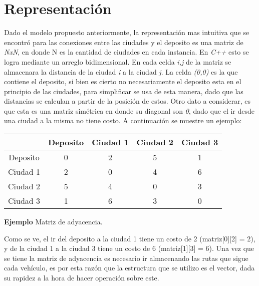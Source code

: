 \documentclass[letter, 10pt]{article}
\begin{document}
\newpage
\section{Representaci\'on}
Dado el modelo propuesto anteriormente, la representaci\'on mas intuitiva que se encontr\'o para las conexiones entre las ciudades y el deposito es una matriz de \emph{NxN}, 
en donde N es la cantidad de ciudades en cada instancia. En \emph{C++} esto se logra mediante un arreglo bidimensional. En cada celda \emph{i,j} de la matriz se almacenara la distancia de la
ciudad \emph{i} a la ciudad \emph{j}. La celda \emph{(0,0)} es la que contiene el deposito, si bien es cierto no necesariamente el deposito esta en el principio de las ciudades, para simplificar 
se usa de esta manera, dado que las distancias se calculan a partir de la posici\'on de estos. Otro dato a considerar, es que esta es una matriz sim\'etrica en donde su diagonal son \emph{0}, dado 
que el ir desde una ciudad a la misma no tiene costo. A continuaci\'on se muestre un ejemplo:

\begin{center}
 \begin{tabular}[t]{|c|c|c|c|c|}
\hline
           & Deposito & Ciudad 1 & Ciudad 2 & Ciudad 3 \\
\hline
Deposito   & 0        & 2        & 5        & 1\\
\hline
Ciudad 1   & 2        & 0        & 4        & 6\\
\hline
Ciudad 2   & 5        & 4        & 0        & 3\\
\hline
Ciudad 3   & 1        & 6        & 3        & 0\\
\hline
\end{tabular}

\end{center}
\begin{center}
\textbf{Ejemplo} Matriz de adyacencia. 
\end{center}
Como se ve, el ir del deposito a la ciudad 1 tiene un costo de 2 (matriz[0][2] = 2), y de la ciudad 1 a la ciudad 3 tiene un costo de 6 (matriz[1][3] = 6).
\newline
Una vez que se tiene la matriz de adyacencia es necesario ir almacenando las rutas que sigue cada veh\'iculo, es por esta raz\'on que la estructura que se utilizo es el vector, dada su rapidez 
a la hora de hacer operaci\'on sobre este.
\end{document}
